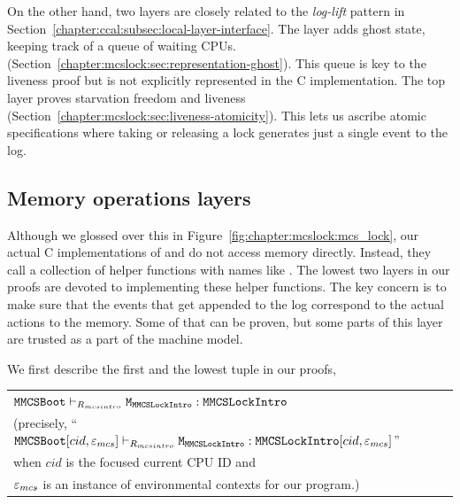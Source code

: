 On the other hand, two layers are closely related to the  \textit{log-lift} pattern in Section~\ref{chapter:ccal:subsec:local-layer-interface}.
The layer  adds ghost state, keeping track of a
queue of waiting CPUs.
(Section~\ref{chapter:mcslock:sec:representation-ghost}). This queue is key to the liveness proof but is not explicitly represented in the C implementation.
The top layer  proves starvation freedom and liveness
(Section~\ref{chapter:mcslock:sec:liveness-atomicity}). This lets us ascribe atomic
specifications where taking or releasing a lock generates just a
single event to the log.




\subsection{Memory operations layers}
\label{chapter:mcslock:subsec:lowestmachinemodel}

Although we glossed over this in Figure~\ref{fig:chapter:mcslock:mcs_lock}, our
actual C implementations of  and
 do not access memory directly.  Instead, they call
a collection of helper functions with names like
. The lowest two layers in our proofs
are devoted to implementing these helper functions.
The key concern is to make sure that the events that get appended to the log
correspond to the actual actions to the memory. Some of that can be proven, 
but some parts of this layer are trusted as a part of the machine model.

We first describe the first and the lowest tuple in our proofs,

\begin{center}
\begin{tabular}{P{0.95\textwidth}}
${\mathrm{\texttt{MMCSBoot}}} \vdash_{R_{mcsintro}} {\mathrm{\texttt{M}}}_{{\mathrm{\texttt{MMCSLockIntro}}}} : {\mathrm{\texttt{MMCSLockIntro}}}$\\
(precisely, ``${\mathrm{\texttt{MMCSBoot}}}[cid, {\varepsilon}_{mcs}] \vdash_{R_{mcsintro}} {\mathrm{\texttt{M}}}_{{\mathrm{\texttt{MMCSLockIntro}}}} : {\mathrm{\texttt{MMCSLockIntro}}}[cid, {\varepsilon}_{mcs}]$'' \\
when $cid$ is the focused current CPU ID and\\
 ${\varepsilon}_{mcs}$ is an instance of environmental contexts for our program.)\\
\end{tabular}
\end{center}

